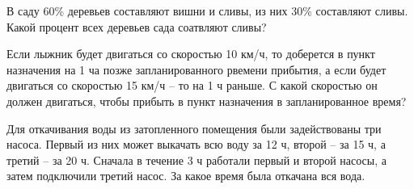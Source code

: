 \documentclass[algebra,twocolumn]{pum}
\begin{document}
\begin{repeating}
  \begin{question}
    В саду 60\% деревьев составляют вишни и сливы, из них 30\% составляют сливы. Какой процент всех деревьев сада соатвляют сливы?
  \end{question}
  \begin{question}
    Если лыжник будет двигаться со скоростью 10 км/ч, то доберется в пункт назначения на 1 ча позже запланированного рвемени прибытия, а если будет двигаться со скоростью 15 км/ч -- то на 1 ч раньше. С какой скоростью он должен двигаться, чтобы прибыть в пункт назначения в запланированное время?
  \end{question}
  \begin{question}
  Для откачивания воды из затопленного помещения были задействованы три насоса. Первый из них может выкачать всю воду за 12 ч, второй -- за 15 ч, а третий -- за 20 ч. Сначала в течение 3 ч работали первый и второй насосы, а затем подключили третий насос. За какое время была откачана вся вода.
  \end{question}
\end{repeating}
\end{document}
